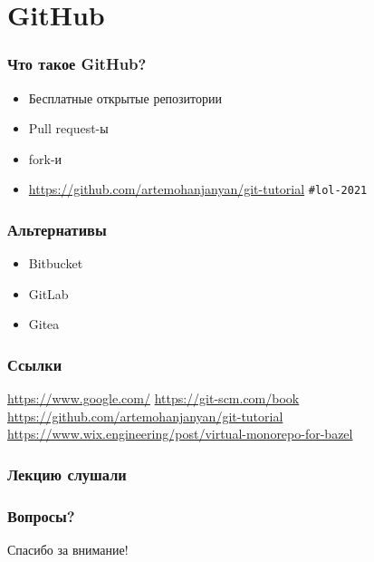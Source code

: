 \documentclass[pdf,russian]{beamer}
\begin{document}
\section{GitHub}

\begin{frame}
    \frametitle{Что такое GitHub?}
    \begin{itemize}
        \pause
        \item Бесплатные открытые репозитории
        \pause
        \item Pull request-ы
        \pause
        \item fork-и
        \pause
        \item \url{https://github.com/artemohanjanyan/git-tutorial}
            \pause\texttt{\#{}lol-2021}
    \end{itemize}
\end{frame}

\begin{frame}
    \frametitle{Альтернативы}
    \begin{itemize}
        \pause
        \item Bitbucket
        \pause
        \item GitLab
        \pause
        \item Gitea
    \end{itemize}
\end{frame}

\begin{frame}
    \frametitle{Ссылки}
    \url{https://www.google.com/}
    \url{https://git-scm.com/book}
    \url{https://github.com/artemohanjanyan/git-tutorial}
    \url{https://www.wix.engineering/post/virtual-monorepo-for-bazel}
\end{frame}

\begin{frame}
    \frametitle{Лекцию слушали}
    
\end{frame}

\begin{frame}
    \frametitle{Вопросы?}
    \pause
    Спасибо за внимание!
\end{frame}
\end{document}

